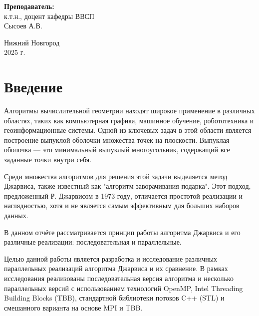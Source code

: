 \documentclass[12pt,a4paper]{extarticle}
\begin{document}
\begin{titlepage}
\begin{center}
\begin{flushright}
        \vspace{1cm}
        
      \noindent\textbf{Преподаватель:} \\
      к.т.н., доцент кафедры ВВСП \\
      {Сысоев А.В.}
      \end{flushright}
      
      \vspace{2em}
      
      \vfill
      
      \begin{center}
        Нижний Новгород \\
        2025 г.
      \end{center}
      
    \end{center}
  \end{titlepage}
  
  \newpage

\tableofcontents
\newpage

\section{Введение}
Алгоритмы вычислительной геометрии находят широкое применение в различных областях, таких как компьютерная графика, машинное обучение, робототехника и геоинформационные системы. Одной из ключевых задач в этой области является построение выпуклой оболочки множества точек на плоскости. Выпуклая оболочка — это минимальный выпуклый многоугольник, содержащий все заданные точки внутри себя.

Среди множества алгоритмов для решения этой задачи выделяется метод Джарвиса, также известный как "алгоритм заворачивания подарка". Этот подход, предложенный Р. Джарвисом в 1973 году, отличается простотой реализации и наглядностью, хотя и не является самым эффективным для больших наборов данных.

В данном отчёте рассматривается принцип работы алгоритма Джарвиса и его различные реализации: последовательная и параллельные.

Целью данной работы является разработка и исследование различных параллельных реализаций алгоритма Джарвиса и их сравнение. В рамках исследования реализованы последовательная версия алгоритма и несколько параллельных версий с использованием технологий OpenMP, Intel Threading Building Blocks (TBB), стандартной библиотеки потоков C++ (STL) и смешанного варианта на основе MPI и TBB. 
\end{document}
